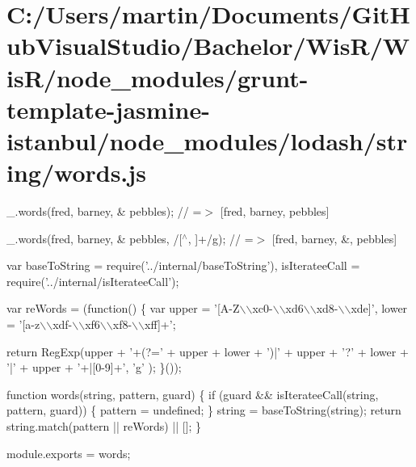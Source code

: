 \hypertarget{_c_1_2_users_2martin_2_documents_2_git_hub_visual_studio_2_bachelor_2_wis_r_2_wis_r_2node_module35760bdbf98e20d48d641688dff4f16a}{}\section{C\+:/\+Users/martin/\+Documents/\+Git\+Hub\+Visual\+Studio/\+Bachelor/\+Wis\+R/\+Wis\+R/node\+\_\+modules/grunt-\/template-\/jasmine-\/istanbul/node\+\_\+modules/lodash/string/words.\+js}
\+\_\+.\+words(\textquotesingle{}fred, barney, \& pebbles\textquotesingle{}); // =$>$ \mbox{[}\textquotesingle{}fred\textquotesingle{}, \textquotesingle{}barney\textquotesingle{}, \textquotesingle{}pebbles\textquotesingle{}\mbox{]}

\+\_\+.\+words(\textquotesingle{}fred, barney, \& pebbles\textquotesingle{}, /\mbox{[}$^\wedge$, \mbox{]}+/g); // =$>$ \mbox{[}\textquotesingle{}fred\textquotesingle{}, \textquotesingle{}barney\textquotesingle{}, \textquotesingle{}\&\textquotesingle{}, \textquotesingle{}pebbles\textquotesingle{}\mbox{]}


\begin{DoxyCodeInclude}
var baseToString = require(\textcolor{stringliteral}{'../internal/baseToString'}),
    isIterateeCall = require(\textcolor{stringliteral}{'../internal/isIterateeCall'});

var reWords = (\textcolor{keyword}{function}() \{
  var upper = \textcolor{stringliteral}{'[A-Z\(\backslash\)\(\backslash\)xc0-\(\backslash\)\(\backslash\)xd6\(\backslash\)\(\backslash\)xd8-\(\backslash\)\(\backslash\)xde]'},
      lower = \textcolor{stringliteral}{'[a-z\(\backslash\)\(\backslash\)xdf-\(\backslash\)\(\backslash\)xf6\(\backslash\)\(\backslash\)xf8-\(\backslash\)\(\backslash\)xff]+'};

  \textcolor{keywordflow}{return} RegExp(upper + \textcolor{stringliteral}{'+(?='} + upper + lower + \textcolor{stringliteral}{')|'} + upper + \textcolor{charliteral}{'?'} + lower + \textcolor{charliteral}{'|'} + upper + \textcolor{stringliteral}{'+|[0-9]+'}, \textcolor{charliteral}{'g'}
      );
\}());

\textcolor{keyword}{function} words(\textcolor{keywordtype}{string}, pattern, guard) \{
  \textcolor{keywordflow}{if} (guard && isIterateeCall(\textcolor{keywordtype}{string}, pattern, guard)) \{
    pattern = undefined;
  \}
  \textcolor{keywordtype}{string} = baseToString(\textcolor{keywordtype}{string});
  \textcolor{keywordflow}{return} \textcolor{keywordtype}{string}.match(pattern || reWords) || [];
\}

module.exports = words;
\end{DoxyCodeInclude}
 